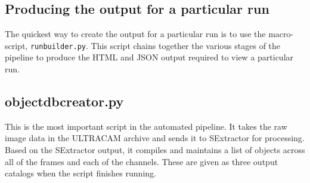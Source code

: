 \begin{itemize}
\end{itemize}

\subsection{Producing the output for a particular run}
The quickest way to create the output for a particular run is to use the macro-script, \texttt{runbuilder.py}. This script chains together the various stages of the pipeline to produce the HTML and JSON output required to view a particular run. 

\subsection{objectdbcreator.py}

This is the most important script in the automated pipeline. It takes the raw image data in the ULTRACAM archive and sends it to SExtractor for processing. Based on the SExtractor output, it compiles and maintains a list of objects across all of the frames and each of the channels. These are given as three output catalogs when the script finishes running. 

